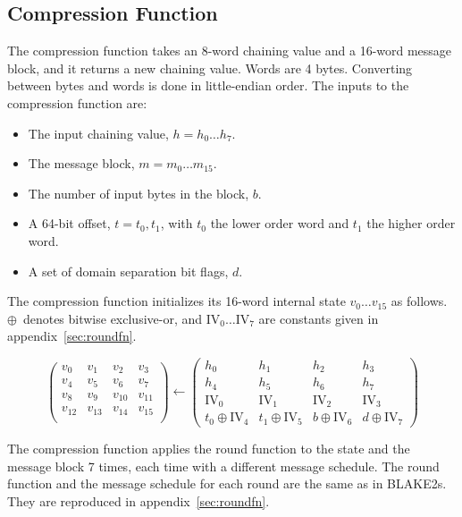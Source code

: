 \documentclass[11pt,notitlepage,a4paper]{article}
\newcommand{\IV}{\text{IV}}
\begin{document}
\subsection{Compression Function}\label{sec:compression}

The compression function takes an 8-word chaining value and a 16-word message
block, and it returns a new chaining value. Words are 4 bytes. Converting
between bytes and words is done in little-endian order. The inputs to the
compression function are:

\begin{itemize}
    \item The input chaining value, $h = h_{0} \ldots h_{7}$.
    \item The message block, $m = m_{0} \ldots m_{15}$.
    \item The number of input bytes in the block, $b$.
    \item A 64-bit offset, $t=t_{0},t_{1}$, with $t_{0}$ the lower order word
        and $t_{1}$ the higher order word.
    \item A set of domain separation bit flags, $d$.
\end{itemize}

The compression function initializes its 16-word internal state $v_{0} \ldots
v_{15}$ as follows. $\oplus$~denotes bitwise exclusive-or, and $\IV_{0} \ldots
\IV_{7}$ are constants given in appendix~\ref{sec:roundfn}.

\begin{equation*}
\begin{pmatrix}
v_{0} & v_{1} & v_{2} & v_{3} \\
v_{4} & v_{5} & v_{6} & v_{7} \\
v_{8} & v_{9} & v_{10} & v_{11} \\
v_{12} & v_{13} & v_{14} & v_{15} \\
\end{pmatrix}
\leftarrow
\begin{pmatrix}
h_{0} & h_{1} & h_{2} & h_{3} \\
h_{4} & h_{5} & h_{6} & h_{7} \\
\IV_{0} & \IV_{1} & \IV_{2} & \IV_{3} \\
t_{0} \oplus \IV_{4} & t_{1} \oplus \IV_{5} & b \oplus \IV_{6} & d \oplus \IV_{7}
\end{pmatrix}
\end{equation*}

The compression function applies the round function to the state and the
message block 7 times, each time with a different message schedule. The round
function and the message schedule for each round are the same as in BLAKE2s.
They are reproduced in appendix~\ref{sec:roundfn}.
\end{document}
